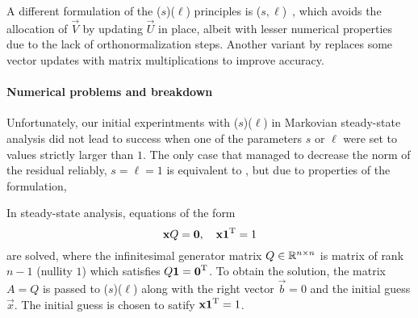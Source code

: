 A different formulation of the ($s$)($\ell$)
principles is ($s, \ell$)~\citep{tanio2010gbi},
which avoids the allocation of $\vec{V}$ by updating $\vec{U}$ in
place, albeit with lesser numerical properties due to the lack of
orthonormalization steps. Another variant by
\textcite{aihara2014variant} replaces some vector updates with matrix
multiplications to improve accuracy.

\paragraph{Numerical problems and breakdown}

Unfortunately, our initial experintments with
($s$)($\ell$) in Markovian steady-state
analysis did not lead to success when one of the parameters $s$ or
$\ell$ were set to values strictly larger than $1$. The only case that
managed to decrease the norm of the residual reliably, $s = \ell = 1$
is equivalent to , but due to properties of the
 formulation,

In steady-state analysis, equations of the form
\begin{equation}
  \label{eq:algorithms:idrstab:equation}
  \bm{\mathrm{x}} Q = \bm{\mathrm{0}}, \quad \bm{\mathrm{x}} \bm{\mathrm{1}}^{\mathrm{T}} = 1
\end{equation}
are solved, where the infinitesimal generator matrix
$Q \in \mathbb{R}^{n \times n}$ is matrix of rank $n - 1$ (nullity $1$) which
satisfies $Q \bm{\mathrm{1}} = \bm{\mathrm{0}}^{\mathrm{T}}$. To obtain the solution, the matrix
$A = Q$ is passed to ($s$)($\ell$) along with
the right vector $\vec{b} = 0$ and the initial guess $\vec{x}$. The
initial guess is chosen to satify $\bm{\mathrm{x}} \bm{\mathrm{1}}^{\mathrm{T}} = 1$.


